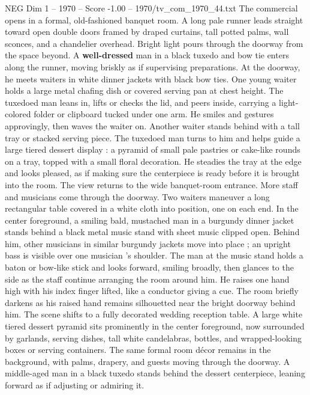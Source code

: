 \begin{textsample}{NEG Dim 1 – 1970 – Score -1.00 – 1970/tv\_com\_1970\_44.txt}  \label{ex:f1_neg_035}
The commercial opens in a formal, old-fashioned banquet room.
A long pale runner leads straight toward open double doors framed by draped curtains, tall potted palms, wall sconces, and a chandelier overhead.
Bright light pours through the doorway from the space beyond.
A \textbf{well-dressed} man in a black tuxedo and bow tie enters along the runner, moving briskly as if supervising preparations.
At the doorway, he meets waiters in white dinner jackets with black bow ties.
One young waiter holds a large metal chafing dish or covered serving pan at chest height.
The tuxedoed man leans in, lifts or checks the lid, and peers inside, carrying a light-colored folder or clipboard tucked under one arm.
He smiles and gestures approvingly, then waves the waiter on.
Another waiter stands behind with a tall tray or stacked serving piece.
The tuxedoed man turns to him and helps guide a large tiered dessert display : a pyramid of small pale pastries or cake-like rounds on a tray, topped with a small floral decoration.
He steadies the tray at the edge and looks pleased, as if making sure the centerpiece is ready before it is brought into the room.
The view returns to the wide banquet-room entrance.
More staff and musicians come through the doorway.
Two waiters maneuver a long rectangular table covered in a white cloth into position, one on each end.
In the center foreground, a smiling bald, mustached man in a burgundy dinner jacket stands behind a black metal music stand with sheet music clipped open.
Behind him, other musicians in similar burgundy jackets move into place ; an upright bass is visible over one musician ’s shoulder.
The man at the music stand holds a baton or bow-like stick and looks forward, smiling broadly, then glances to the side as the staff continue arranging the room around him.
He raises one hand high with his index finger lifted, like a conductor giving a cue.
The room briefly darkens as his raised hand remains silhouetted near the bright doorway behind him.
The scene shifts to a fully decorated wedding reception table.
A large white tiered dessert pyramid sits prominently in the center foreground, now surrounded by garlands, serving dishes, tall white candelabras, bottles, and wrapped-looking boxes or serving containers.
The same formal room décor remains in the background, with palms, drapery, and guests moving through the doorway.
A middle-aged man in a black tuxedo stands behind the dessert centerpiece, leaning forward as if adjusting or admiring it.

\end{textsample}
